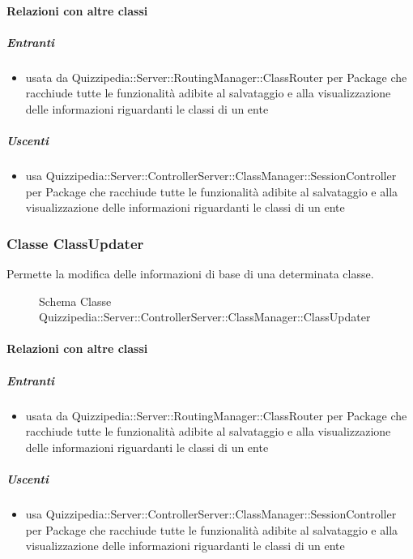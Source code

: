 \paragraph{Relazioni con altre classi}
\subparagraph{Entranti}
\begin{itemize}
\item usata da Quizzipedia::Server::RoutingManager::ClassRouter per Package che racchiude tutte le funzionalità adibite al salvataggio e alla visualizzazione delle informazioni riguardanti le classi di un ente
\end{itemize}
\subparagraph{Uscenti}
\begin{itemize}
\item usa Quizzipedia::Server::ControllerServer::ClassManager::SessionController per Package che racchiude tutte le funzionalità adibite al salvataggio e alla visualizzazione delle informazioni riguardanti le classi di un ente
\end{itemize}
\subsubsection{Classe ClassUpdater}
Permette la modifica delle informazioni di base di una determinata classe.
\begin{figure}[H]
\centering
\noindent{}
\caption[Schema Classe ClassUpdater]{Schema Classe Quizzipedia::Server::ControllerServer::ClassManager::ClassUpdater}
\end{figure}
\paragraph{Relazioni con altre classi}
\subparagraph{Entranti}
\begin{itemize}
\item usata da Quizzipedia::Server::RoutingManager::ClassRouter per Package che racchiude tutte le funzionalità adibite al salvataggio e alla visualizzazione delle informazioni riguardanti le classi di un ente
\end{itemize}
\subparagraph{Uscenti}
\begin{itemize}
\item usa Quizzipedia::Server::ControllerServer::ClassManager::SessionController per Package che racchiude tutte le funzionalità adibite al salvataggio e alla visualizzazione delle informazioni riguardanti le classi di un ente
\end{itemize}
